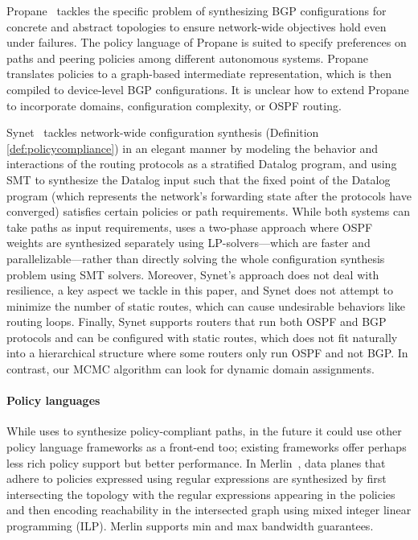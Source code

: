 Propane~\cite{propane, propaneat} tackles the specific problem of
synthesizing BGP configurations for concrete and abstract topologies
to ensure network-wide objectives hold even under failures. The policy
language of Propane is suited to specify preferences on paths and
peering policies among different autonomous systems. Propane
translates policies to a graph-based intermediate representation,
which is then compiled to device-level BGP configurations. It is
unclear how to extend Propane to incorporate domains, configuration
complexity, or OSPF routing.

Synet~\cite{synet} tackles network-wide configuration synthesis
(Definition \ref{def:policycompliance}) in an elegant manner by
modeling the behavior and interactions of the routing protocols as a
stratified Datalog program, and using SMT to synthesize the Datalog
input such that the fixed point of the Datalog program (which
represents the network's forwarding state after the protocols have
converged) satisfies certain policies or path requirements.  While
both systems can take paths as input requirements, \name uses
a two-phase approach where OSPF weights are synthesized
separately using
LP-solvers---which are faster and parallelizable---rather than directly  
solving the whole configuration synthesis problem using SMT solvers.  
Moreover, Synet's approach
does not deal with resilience, a key aspect we tackle in this paper,
and
Synet does not attempt to minimize the number of static routes,
which can cause undesirable behaviors like routing loops.  Finally,
Synet supports routers that run both OSPF and BGP protocols and can be
configured with static routes, which does not fit naturally into a
hierarchical structure where some routers only run OSPF and not
BGP. In contrast, our MCMC algorithm can look for dynamic domain
assignments.

\paragraph{Policy languages} While \name uses \genesis 
to synthesize policy-compliant paths, in the future it could use
other policy language frameworks as a front-end
too; existing frameworks offer perhaps less rich policy support but better
performance. %
In Merlin~\cite{merlin}, data planes that adhere to policies expressed
using regular expressions are synthesized by first intersecting the
topology with the regular expressions appearing in the policies and
then encoding reachability in the intersected graph using mixed
integer linear programming (ILP).  Merlin supports min and max
bandwidth guarantees.


